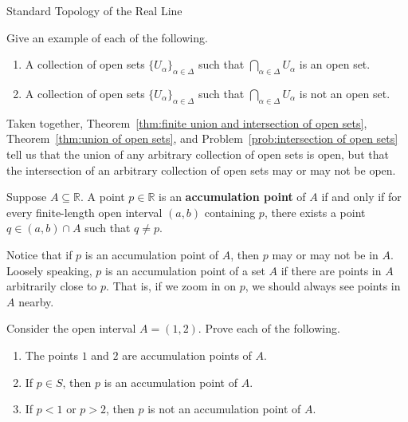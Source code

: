 \begin{section}{Standard Topology of the Real Line}
\begin{problem}\label{prob:intersection of open sets}
Give an example of each of the following.
\begin{enumerate}[label=\textrm{(\alph*)}]
\item A collection of open sets $\{U_{\alpha}\}_{\alpha\in\Delta}$ such that $\bigcap_{\alpha\in\Delta} U_{\alpha}$ is an open set.
\item A collection of open sets $\{U_{\alpha}\}_{\alpha\in\Delta}$ such that $\bigcap_{\alpha\in\Delta} U_{\alpha}$ is not an open set.
\end{enumerate}
\end{problem}

\begin{remark}\label{rem:union vs intersection of open sets}
Taken together, Theorem~\ref{thm:finite union and intersection of open sets}, Theorem~\ref{thm:union of open sets}, and Problem~\ref{prob:intersection of open sets} tell us that the union of any arbitrary collection of open sets is open, but that the intersection of an arbitrary collection of open sets may or may not be open.  
\end{remark}

\begin{definition}
Suppose $A\subseteq \mathbb{R}$. A point $p\in \mathbb{R}$ is an \textbf{accumulation point} of $A$ if and only if for every finite-length open interval $(a,b)$ containing $p$, there exists a point $q \in (a,b)\cap A$ such that $q\neq p$.
\end{definition}

Notice that if $p$ is an accumulation point of $A$, then $p$ may or may not be in $A$. Loosely speaking, $p$ is an accumulation point of a set $A$ if there are points in $A$ arbitrarily close to $p$. That is, if we zoom in on $p$, we should always see points in $A$ nearby.

\begin{problem}
Consider the open interval $A=(1,2)$. Prove each of the following.
\begin{enumerate}[label=\textrm{(\alph*)}]
\item The points $1$ and $2$ are accumulation points of $A$.
\item If $p\in S$, then $p$ is an accumulation point of $A$.
\item If $p<1$ or $p>2$, then $p$ is not an accumulation point of $A$.
\end{enumerate}
\end{problem}


\end{section}
